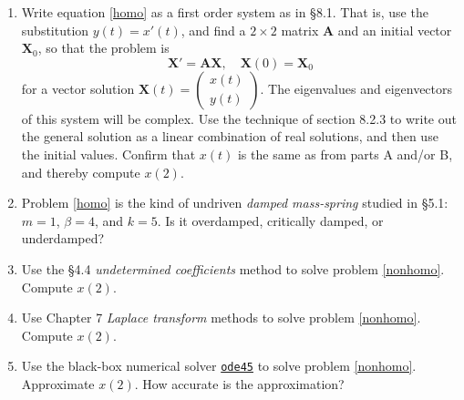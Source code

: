 \documentclass[12pt]{article}
\theoremstyle{definition}
\begin{document}
\begin{enumerate}
\item Write equation \eqref{homo} as a first order system as in \S8.1.  That is, use the substitution $y(t)=x'(t)$, and find a $2\times 2$ matrix $\mathbf{A}$ and an initial vector $\mathbf{X}_0$, so that the problem is
    $$\mathbf{X}' = \mathbf{A} \mathbf{X}, \quad \mathbf{X}(0)=\mathbf{X}_0$$
for a vector solution $\mathbf{X}(t) = \begin{pmatrix} x(t) \\ y(t) \end{pmatrix}$.  The eigenvalues and eigenvectors of this system will be complex.  Use the technique of section 8.2.3 to write out the general solution as a linear combination of real solutions, and then use the initial values.  Confirm that $x(t)$ is the same as from parts A and/or B, and thereby compute $x(2)$.
\item Problem \eqref{homo} is the kind of undriven  \emph{damped mass-spring} studied in \S5.1: $m=1$, $\beta=4$, and $k=5$.  Is it overdamped, critically damped, or underdamped?
\item Use the \S4.4 \emph{undetermined coefficients} method to solve problem \eqref{nonhomo}.  Compute $x(2)$.
\item Use Chapter 7 \emph{Laplace transform} methods to solve problem \eqref{nonhomo}.  Compute $x(2)$.
\item Use the black-box numerical solver \href{https://www.mathworks.com/help/matlab/ref/ode45.html}{\texttt{ode45}} to solve problem \eqref{nonhomo}.  Approximate $x(2)$.  How accurate is the approximation?
\end{enumerate}
\end{document}
